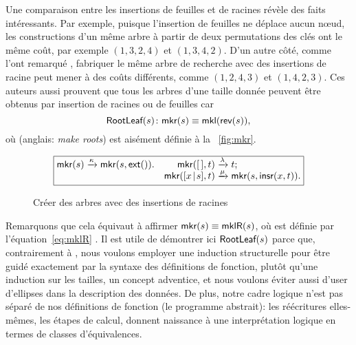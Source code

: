 Une comparaison entre les insertions de feuilles et de racines révèle
des faits intéressants. Par exemple, puisque l'insertion de feuilles
ne déplace aucun nœud, les constructions d'un même arbre à partir de
deux permutations des clés ont le même coût, par exemple \((1,3,2,4)\)
et \((1,3,4,2)\). D'un autre côté, comme l'ont remarqué
\cite{GeldenhuysVanderMerwe_2009}, fabriquer le même arbre de
recherche avec des insertions de racine peut mener à des coûts
différents, comme \((1,2,4,3)\) et \((1,4,2,3)\). Ces auteurs aussi
prouvent que tous les arbres d'une taille donnée peuvent être obtenus
par insertion de racines ou de feuilles car
\begin{equation}
\pred{RootLeaf}{s} \colon \fun{mkr}(s) \equiv \fun{mkl}(\fun{rev}(s)),
\label{thm_RootLeaf}
\index{RootLeaf@\predName{RootLeaf}}
\end{equation}
où  
(anglais: \emph{make roots}) est aisément définie à la
\fig~\vref{fig:mkr}.
\begin{figure}
\begin{equation*}
\boxed{
\begin{array}{@{}r@{\;}l@{\;}lr@{\;}l@{\;}l@{}}
\fun{mkr}(s) & \xrightarrow{\smash{\kappa}} &
\fun{mkr}(s,\fun{ext}()).
& \fun{mkr}(\el,t) & \xrightarrow{\smash{\lambda}} & t;\\
&&&\fun{mkr}(\cons{x}{s},t) & \xrightarrow{\smash{\mu}} & \fun{mkr}(s,\fun{insr}(x,t)).
\end{array}}
\end{equation*}
\caption{Créer des arbres avec des insertions de racines}
\label{fig:mkr}
\end{figure}
Remarquons que cela équivaut à affirmer \(\textsf{mkr}(s) \equiv
\textsf{mklR}(s)\), où  est définie par
l'équation~\eqref{eq:mklR} . Il est utile de
démontrer ici \(\textsf{RootLeaf}({s})\) parce que, contrairement à
\cite{GeldenhuysVanderMerwe_2009}, nous voulons employer une induction
structurelle pour être guidé exactement par la syntaxe des définitions
de fonction, plutôt qu'une induction sur les tailles, un concept
adventice, et nous voulons éviter aussi d'user d'ellipses dans la
description des données. De plus, notre cadre logique n'est pas séparé
de nos définitions de fonction (le programme abstrait): les
réécritures elles-mêmes, les étapes de calcul, donnent naissance à
une interprétation logique en termes de classes d'équivalences.

